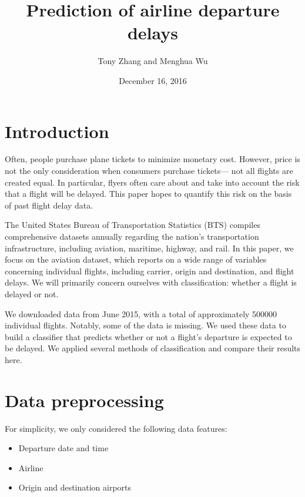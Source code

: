 \documentclass{article}
\title{Prediction of airline departure delays}
\author{Tony Zhang and Menghua Wu}
\date{December 16, 2016}
\begin{document}
\maketitle

\begin{multicols}{2}


\section{Introduction}

Often, people purchase plane tickets
to minimize monetary cost.
However, price is not the only consideration
when consumers purchase tickets---
not all flights are created equal.
In particular,
flyers often care about and take into account
the risk that a flight will be delayed.
This paper hopes to quantify this risk
on the basis of past flight delay data.

The United States Bureau of Transportation Statistics (BTS)
compiles comprehensive datasets annually
regarding the nation's transportation infrastructure,
including aviation, maritime, highway, and rail.
In this paper, we focus on the aviation dataset,
which reports on a wide range of variables concerning individual flights,
including carrier, origin and destination, and flight delays.
We will primarily concern ourselves with classification:
whether a flight is delayed or not.

We downloaded data from June 2015,
with a total of approximately 500000 individual flights.
Notably, some of the data is missing.
We used these data to build a classifier
that predicts whether or not a flight's departure
is expected to be delayed.
We applied several methods of classification
and compare their results here.


\section{Data preprocessing}


For simplicity,
we only considered the following data features:
\begin{itemize}
    \item
    Departure date and time
    \item
    Airline
    \item
    Origin and destination airports
\end{itemize}


\end{multicols}
\end{document}
